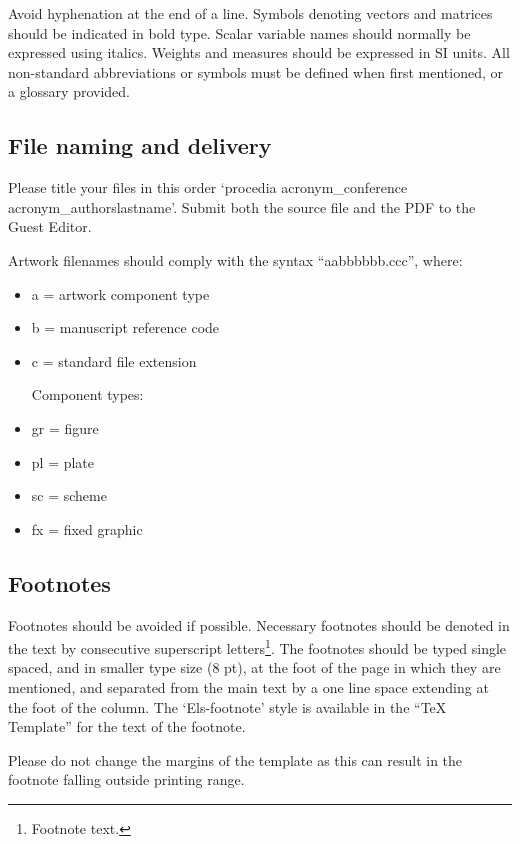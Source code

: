\documentclass[3p,times,procedia]{elsarticle}
\begin{document}
    Avoid hyphenation at the end of a line. Symbols denoting vectors and matrices should be indicated in bold type. Scalar variable names should normally be expressed using italics. Weights and measures should be expressed in SI units. All non-standard abbreviations or symbols must be defined when first mentioned, or a glossary provided.

\subsection{File naming and delivery}
Please title your files in this order `procedia acronym\_conference acronym\_authorslastname'.  Submit both the source file and the PDF to the Guest Editor.

Artwork filenames should comply with the syntax ``aabbbbbb.ccc'', where:
\begin{itemize}
\item a = artwork component type
\item b = manuscript reference code
\item c = standard file extension

Component types:
\item gr = figure
\item pl = plate
\item sc = scheme
\item fx = fixed graphic
\end{itemize}


\subsection{Footnotes}
Footnotes should be avoided if possible. Necessary footnotes should be denoted in the text by consecutive superscript letters\footnote{Footnote text.}. The footnotes should be typed single spaced, and in smaller type size (8 pt), at the foot of the page in which they are mentioned, and separated from the main text by a one line space extending at the foot of the column. The `Els-footnote' style is available in the ``TeX Template'' for the text of the footnote.

Please do not change the margins of the template as this can result in the footnote falling outside printing range.
\end{document}
